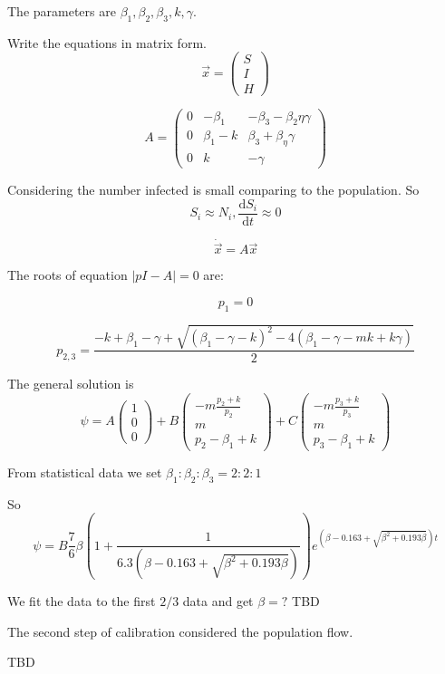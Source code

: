 \documentclass[12pt]{article}
\begin{document}
The parameters are $\beta_1,\beta_2,\beta_3, k,\gamma$.

Write the equations in matrix form.
$$\vec{x} =  \begin{pmatrix}
S\\I\\H
 \end{pmatrix}$$ 
 
 $$
 A =  \begin{pmatrix}
0 &-\beta_1 & -\beta_3-\beta_2\eta\gamma \\
0 &\beta_1 -k & \beta_3 + \beta_\eta\gamma \\
0 & k & -\gamma 
 \end{pmatrix}
 $$
 
 Considering the number infected is small comparing to the population. So $$S_i \approx N_i, \frac{\mathrm{d}S_i}{\mathrm{d}t} \approx 0$$
 
 $$\dot{\vec{x}} =  A  \vec{x}$$
 
 The roots of equation $|pI-A| = 0$ are:
 
 $$
 p_1 = 0
 $$
 
 $$
 p_{2,3} = \frac{-k+\beta_1 - \gamma + \sqrt{  (\beta_1 - \gamma - k)^2  - 4(\beta_1 - \gamma - mk + k\gamma) } }{2}
 $$
 
 
 The general solution is 
$$\psi = A\begin{pmatrix}
1\\0\\0
 \end{pmatrix}
 +B\begin{pmatrix}
-m\frac{p_2 + k}{p_2}\\ m \\ p_2 - \beta_1 + k
 \end{pmatrix}
 +C\begin{pmatrix}
-m\frac{p_3 + k}{p_3}\\ m \\ p_3- \beta_1 + k
 \end{pmatrix}
$$


From statistical data we set $\beta_1:\beta_2:\beta_3 = 2:2:1$
 
So $$\psi = B\frac{7}{6}\beta(1+\frac{1}{6.3(\beta - 0.163+\sqrt{\beta^2 + 0.193\beta})}) e^{(\beta - 0.163+\sqrt{\beta^2 + 0.193\beta})t}$$
 
 
We fit the data to the first $2/3$ data and get $\beta = ?$ TBD

The second step of calibration considered the population flow.

TBD
\end{document}
